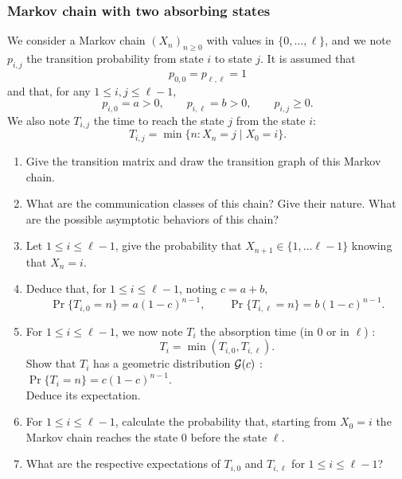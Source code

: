 \subsubsection{Markov chain with two absorbing states}

We consider a Markov chain $(X_n)_{n \geq 0}$ with values in $\{0, \dots, \ell\}$, and we note $p_{i, j}$ the transition probability from state $i$ to state $j$. It is assumed that 
$$
p_{0, 0} = p_{\ell, \ell} = 1 
$$
and that, for any $1 \leq i, j \leq \ell-1$, 
$$
p_{i, 0} = a > 0, \qquad p_{i, \ell} = b > 0, \qquad p_{i, j} \geq 0.
$$
We also note $T_{i, j}$ the time to reach the state $j$ from the state $i$:
$$
T_{i, j} = \min\{n: X_n = j \mid X_0 = i\}.
$$

\begin{enumerate}
  \item Give the transition matrix and draw the transition graph of this Markov chain.
  \item What are the communication classes of this chain? Give their nature. What are the possible asymptotic behaviors of this chain?
  \item Let $1 \leq i \leq \ell-1$, give the probability that $X_{n+1} \in \{1, \dots \ell-1\}$ knowing that $X_n = i$.
  \item Deduce that, for $1 \leq i \leq \ell-1$, noting $c = a + b$, 
  $$
  \Pr\{T_{i, 0} = n\} = a (1 - c)^{n-1}, \qquad
  \Pr\{T_{i, \ell} = n\} = b (1 - c)^{n-1}.
  $$
  \item For $1 \leq i \leq \ell-1$, we now note $T_i$ the absorption time (in 0 or in $\ell$) : 
  $$
  T_i = \min(T_{i, 0}, T_{i, \ell}).
  $$
  Show that $T_i$ has a geometric distribution $\mathcal{G}(c)$ : $\Pr\{T_i = n\} = c (1 - c)^{n-1}$. \\
  Deduce its expectation.  
  \item For $1 \leq i \leq \ell-1$, calculate the probability that, starting from $X_0 = i$ the Markov chain reaches the state 0 before the state $\ell$.
  \item What are the respective expectations of $T_{i, 0}$ and $T_{i, \ell}$ for $1 \leq i \leq \ell-1$?
\end{enumerate}
